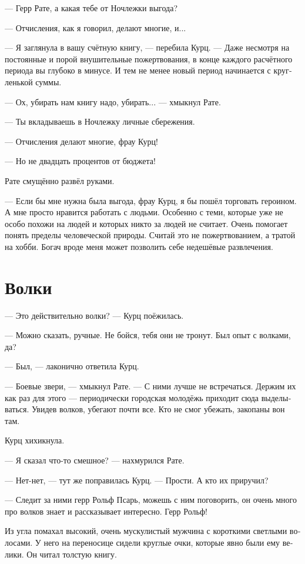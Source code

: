 \documentclass[a4paper,12pt,fleqn]{book}\usepackage{cooltooltips}\usepackage{polyglossia}\setdefaultlanguage[babelshorthands=true]{russian}\setotherlanguage{english}\defaultfontfeatures{Ligatures=TeX,Mapping=tex-text} \usepackage{xcolor}\definecolor{lightgray}{HTML}{bbbbbb}\color{lightgray}\newcommand{\ml}[3]{\textenglish{\textcolor{black}{#3}}}
\begin{document}
--- Герр Рате, а какая тебе от Ночлежки выгода?

--- Отчисления, как я говорил, делают многие, и...

--- Я заглянула в вашу счётную книгу, --- перебила Курц.
--- Даже несмотря на постоянные и порой внушительные пожертвования, в конце каждого расчётного периода вы глубоко в минусе.
И тем не менее новый период начинается с кругленькой суммы.

--- Ох, убирать нам книгу надо, убирать... --- хмыкнул Рате.

--- Ты вкладываешь в Ночлежку личные сбережения.

--- Отчисления делают многие, фрау Курц!

--- Но не двадцать процентов от бюджета!

Рате смущённо развёл руками.

--- Если бы мне нужна была выгода, фрау Курц, я бы пошёл торговать героином.
А мне просто нравится работать с людьми.
Особенно с теми, которые уже не особо похожи на людей и которых никто за людей не считает.
Очень помогает понять пределы человеческой природы.
Считай это не пожертвованием, а тратой на хобби.
Богач вроде меня может позволить себе недешёвые развлечения.

\section{Волки}

--- Это действительно волки? --- Курц поёжилась.

--- Можно сказать, ручные.
Не бойся, тебя они не тронут.
Был опыт с волками, да?

--- Был, --- лаконично ответила Курц.

--- Боевые звери, --- хмыкнул Рате.
--- С ними лучше не встречаться.
Держим их как раз для этого --- периодически городская молодёжь приходит сюда выделываться.
Увидев волков, убегают почти все.
Кто не смог убежать, закопаны вон там.

Курц хихикнула.

--- Я сказал что-то смешное? --- нахмурился Рате.

--- Нет-нет, --- тут же поправилась Курц.
--- Прости.
А кто их приручил?

--- Следит за ними герр Рольф Псарь, можешь с ним поговорить, он очень много про волков знает и рассказывает интересно.
Герр Рольф!

Из угла помахал высокий, очень мускулистый мужчина с короткими светлыми волосами.
У него на переносице сидели круглые очки, которые явно были ему велики.
Он читал толстую книгу.
\end{document}
